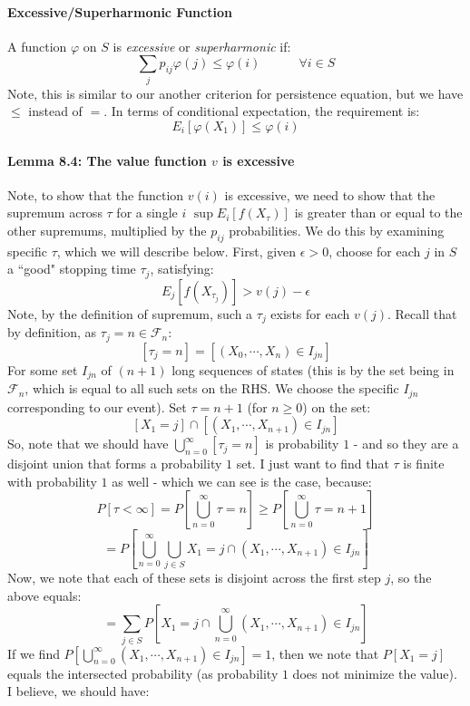 \documentclass[12pt,a4paper]{article}
\newcommand{\1}[1]{\mathbbm{1}\left\{ #1 \right\}}
\newcommand{\fcal}{\mathcal{F}}
\begin{document}
\paragraph{Excessive/Superharmonic Function} A function $\varphi$ on $S$ is \textit{excessive} or \textit{superharmonic} if:
$$
	\sum_j p_{ij} \varphi(j) \leq \varphi(i) \quad\quad\quad \forall i \in S
$$
Note, this is similar to our another criterion for persistence equation, but we have $\leq$ instead of $=$. In terms of conditional expectation, the requirement is:
$$
	E_i\left[\varphi(X_1)\right] \leq \varphi(i)
$$

\paragraph{Lemma 8.4: The value function $v$ is excessive} Note, to show that the function $v(i)$ is excessive, we need to show that the supremum across $\tau$ for a single $i$ $\sup E_i\left[f(X_\tau)\right]$ is greater than or equal to the other supremums, multiplied by the $p_{ij}$ probabilities. We do this by examining specific $\tau$, which we will describe below. First, given $\epsilon > 0$, choose for each $j$ in $S$ a ``good" stopping time $\tau_j$, satisfying:
$$
	E_j\left[f(X_{\tau_j})\right] > v(j) - \epsilon
$$
Note, by the definition of supremum, such a $\tau_j$ exists for each $v(j)$. Recall that by definition, as $\tau_j = n \in \fcal_n$:
$$
	[\tau_j = n] = \left[(X_0, \cdots, X_n) \in I_{jn}\right]
$$
For some set $I_{jn}$ of $(n+1)$ long sequences of states (this is by the set being in $\fcal_n$, which is equal to all such sets on the RHS. We choose the specific $I_{jn}$ corresponding to our event). Set $\tau = n+1$ (for $n \geq 0$) on the set:
$$
	\left[X_1 = j\right] \cap \left[(X_1, \cdots, X_{n+1}) \in I_{jn}\right]
$$
So, note that we should have $\bigcup_{n=0}^\infty [\tau_j = n]$ is probability $1$ - and so they are a disjoint union that forms a probability $1$ set. I just want to find that $\tau$ is finite with probability $1$ as well - which we can see is the case, because:
$$
	P\left[\tau < \infty\right] =
	P\left[\bigcup_{n=0}^\infty \tau = n\right] \geq
	P\left[\bigcup_{n=0}^\infty \tau = n + 1\right]
$$
$$
	= P\left[\bigcup_{n=0}^\infty \bigcup_{j \in S} X_1 = j \cap (X_1, \cdots, X_{n+1}) \in I_{jn}\right]
$$
Now, we note that each of these sets is disjoint across the first step $j$, so the above equals:
$$
	= \sum_{j \in S} P\left[X_1 = j \cap \bigcup_{n=0}^\infty (X_1, \cdots, X_{n+1}) \in I_{jn}\right]
$$
If we find $P\left[\bigcup_{n=0}^\infty (X_1, \cdots, X_{n+1}) \in I_{jn}\right] = 1$, then we note that $P[X_1 = j]$ equals the intersected probability (as probability $1$ does not minimize the value). I believe, we should have:
\end{document}
